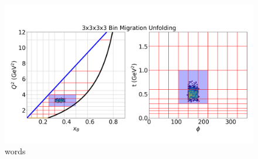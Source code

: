         \begin{figure}[ht]
        \centering
        \includegraphics[trim={0 0 0 0},clip,width=\textwidth]{Chapters/Ch5-Further/0_IBU/pics/kerneling/bin_migration_1_1_1_1.png}
        \caption[words]{words}
        \label{fig:ibu1}
        \end{figure}
    
